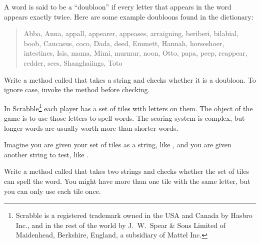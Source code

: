 \begin{exercise}  %
\label{doubloon}


A word is said to be a ``doubloon'' if every letter that appears in the word appears exactly twice.
Here are some example doubloons found in the dictionary:

\begin{quote}
Abba, Anna, appall, appearer, appeases, arraigning, beriberi, bilabial, boob, Caucasus, coco, Dada, deed, Emmett, Hannah, horseshoer, intestines, Isis, mama, Mimi, murmur, noon, Otto, papa, peep, reappear, redder, sees, Shanghaiings, Toto
\end{quote}

Write a method called  that takes a string and checks whether it is a doubloon.
To ignore case, invoke the  method before checking.
\end{exercise}


\begin{exercise}  %


In Scrabble\footnote{Scrabble is a registered trademark owned in the USA and Canada by Hasbro Inc., and in the rest of the world by J.\ W.\ Spear \& Sons Limited of Maidenhead, Berkshire, England, a subsidiary of Mattel Inc.} each player has a set of tiles with letters on them.
The object of the game is to use those letters to spell words.
The scoring system is complex, but longer words are usually worth more than shorter words.

Imagine you are given your set of tiles as a string, like , and you are given another string to test, like .

Write a method called  that takes two strings and checks whether the set of tiles can spell the word.
You might have more than one tile with the same letter, but you can only use each tile once.

\end{exercise}
